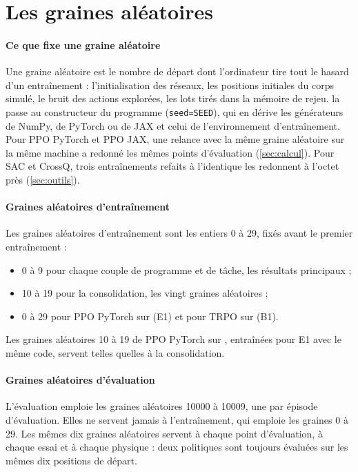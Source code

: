 \section{Les graines aléatoires}\label{sec:graines}

\paragraph{Ce que fixe une graine aléatoire}
Une graine aléatoire est le nombre de départ dont l'ordinateur tire tout le hasard d'un entraînement :
l'initialisation des réseaux, les positions initiales du corps simulé, le bruit des actions explorées, les lots
tirés dans la mémoire de rejeu.  la passe au constructeur du programme
(\texttt{seed=SEED}), qui en dérive les générateurs de NumPy, de PyTorch ou de JAX et celui de
l'environnement d'entraînement. Pour PPO PyTorch et PPO JAX, une relance avec la même graine aléatoire sur la
même machine a redonné les mêmes points d'évaluation (\cref{sec:calcul}). Pour SAC et CrossQ, trois
entraînements refaits à l'identique les redonnent à l'octet près (\cref{sec:outils}).

\paragraph{Graines aléatoires d'entraînement}
Les graines aléatoires d'entraînement sont les entiers 0 à 29, fixés avant le premier entraînement :
\begin{itemize}
  \item 0 à 9 pour chaque couple de programme et de tâche, les résultats principaux ;
  \item 10 à 19 pour la consolidation, les vingt graines aléatoires ;
  \item 0 à 29 pour PPO PyTorch sur  (E1) et pour TRPO sur  (B1).
\end{itemize}
Les graines aléatoires 10 à 19 de PPO PyTorch sur , entraînées pour E1 avec le même code, servent telles
quelles à la consolidation.

\paragraph{Graines aléatoires d'évaluation}
L'évaluation emploie les graines aléatoires \num{10000} à \num{10009}, une par épisode d'évaluation. Elles ne
servent jamais à l'entraînement, qui emploie les graines 0 à 29. Les mêmes dix graines aléatoires servent à chaque point
d'évaluation, à chaque essai et à chaque physique : deux politiques sont toujours évaluées sur les mêmes dix
positions de départ.

